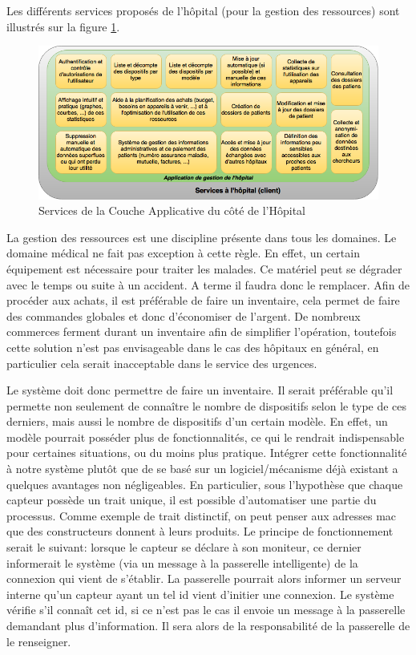 Les différents services proposés de l'hôpital (pour la gestion des ressources) sont illustrés sur la figure \ref{hopital}.
\newline
\begin{figure}[h!]
	\hspace*{-2.5cm}
	\centering
	\includegraphics[width=1.4\textwidth]{hopital.png}
	\caption{Services de la Couche Applicative du côté de l'Hôpital}
	\label{hopital}
\end{figure}

La gestion des ressources est une discipline présente dans tous les domaines. Le domaine médical ne fait pas exception à cette
règle. En effet, un certain équipement est nécessaire pour traiter les malades. Ce matériel peut se dégrader avec le temps ou
suite à un accident. A terme il faudra donc le remplacer. Afin de procéder aux achats, il est préférable de faire un inventaire,
cela permet de faire des commandes globales et donc d'économiser de l'argent. De nombreux commerces ferment durant un inventaire
afin de simplifier l'opération, toutefois cette solution n'est pas envisageable dans le cas des hôpitaux en général, en
particulier cela serait inacceptable dans le service des urgences.  
\newline

Le système doit donc permettre de faire un inventaire. Il serait préférable qu'il permette non seulement de connaître le nombre de
dispositifs selon le type de ces derniers, mais aussi le nombre de dispositifs d'un certain modèle. En effet, un modèle pourrait
posséder plus de fonctionnalités, ce qui le rendrait indispensable pour certaines situations, ou du moins plus pratique. Intégrer
cette fonctionnalité à notre système plutôt que de se basé sur un logiciel/mécanisme déjà existant a quelques avantages non
négligeables. En particulier, sous l'hypothèse que chaque capteur possède un trait unique, il est possible d'automatiser une
partie du processus. Comme exemple de trait distinctif, on peut penser aux adresses mac que des constructeurs donnent à leurs
produits. Le principe de fonctionnement serait le suivant: lorsque le capteur se déclare à son moniteur, ce dernier informerait le
système (via un message à la passerelle intelligente) de la connexion qui vient de s'établir. La passerelle pourrait alors
informer un serveur interne qu'un capteur ayant un tel id vient d'initier une connexion. Le système vérifie s'il connaît cet id,
si ce n'est pas le cas il envoie un message à la passerelle demandant plus d'information. Il sera alors de la responsabilité de la
passerelle de le renseigner.  
\newline

